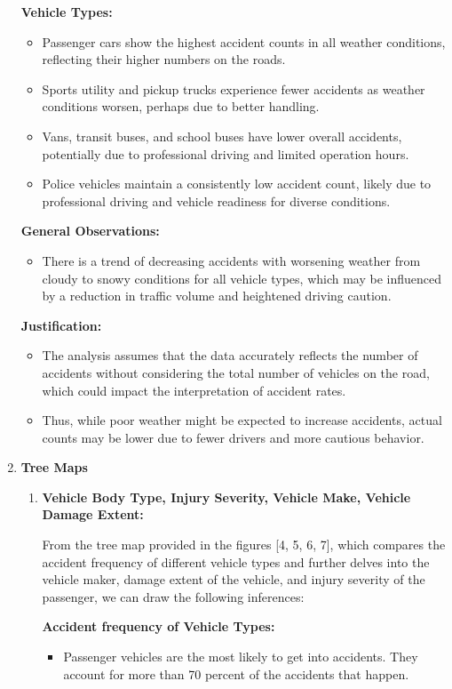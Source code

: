 \documentclass[conference]{IEEEtran}
\begin{document}
\begin{enumerate}
\textbf{Vehicle Types:}
\begin{itemize}
    \item Passenger cars show the highest accident counts in all weather conditions, reflecting their higher numbers on the roads.
    \item Sports utility and pickup trucks experience fewer accidents as weather conditions worsen, perhaps due to better handling.
    \item Vans, transit buses, and school buses have lower overall accidents, potentially due to professional driving and limited operation hours.
    \item Police vehicles maintain a consistently low accident count, likely due to professional driving and vehicle readiness for diverse conditions.
\end{itemize}

\textbf{General Observations:}
\begin{itemize}
    \item There is a trend of decreasing accidents with worsening weather from cloudy to snowy conditions for all vehicle types, which may be influenced by a reduction in traffic volume and heightened driving caution.
\end{itemize}

\textbf{Justification:}
\begin{itemize}
    \item The analysis assumes that the data accurately reflects the number of accidents without considering the total number of vehicles on the road, which could impact the interpretation of accident rates.
    \item Thus, while poor weather might be expected to increase accidents, actual counts may be lower due to fewer drivers and more cautious behavior.
\end{itemize}

\item \textbf{ Tree Maps}
\begin{enumerate}
    \item \textbf{Vehicle Body Type, Injury Severity, Vehicle Make, Vehicle Damage Extent: }

    From the tree map provided in the figures [4, 5, 6, 7], which compares the accident frequency of different vehicle types and further delves into the vehicle maker, damage extent of the vehicle, and injury severity of the passenger, we can draw the following inferences:

    \textbf{Accident frequency of Vehicle Types: }
    \begin{itemize}
        \item Passenger vehicles are the most likely to get into accidents. They account for more than 70 percent of the accidents that happen. 
        

\end{itemize}
\end{enumerate}
\end{enumerate}
\end{document}
